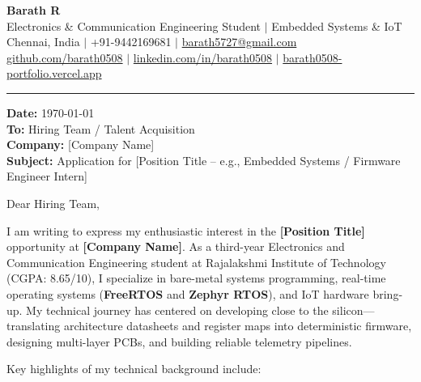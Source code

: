 \documentclass[a4paper,10pt]{article}
\begin{document}
\begin{center}
    {\LARGE \textbf{Barath R}} \\[3pt]
    Electronics \& Communication Engineering Student $\vert$ Embedded Systems \& IoT \\[2pt]
    Chennai, India $\vert$ +91-9442169681 $\vert$ \href{mailto:barath5727@gmail.com}{barath5727@gmail.com} \\
    \href{https://github.com/barath0508}{github.com/barath0508} $\vert$ \href{https://www.linkedin.com/in/barath0508/}{linkedin.com/in/barath0508} $\vert$ \href{https://barath0508-portfolio.vercel.app}{barath0508-portfolio.vercel.app}
\end{center}

\vspace{6pt}
\hrule
\vspace{12pt}

\textbf{Date:} \today \\
\textbf{To:} Hiring Team / Talent Acquisition \\
\textbf{Company:} [Company Name] \\
\textbf{Subject:} Application for [Position Title -- e.g., Embedded Systems / Firmware Engineer Intern]

\vspace{8pt}

Dear Hiring Team,

I am writing to express my enthusiastic interest in the \textbf{[Position Title]} opportunity at \textbf{[Company Name]}. As a third-year Electronics and Communication Engineering student at Rajalakshmi Institute of Technology (CGPA: 8.65/10), I specialize in bare-metal systems programming, real-time operating systems (\textbf{FreeRTOS} and \textbf{Zephyr RTOS}), and IoT hardware bring-up. My technical journey has centered on developing close to the silicon---translating architecture datasheets and register maps into deterministic firmware, designing multi-layer PCBs, and building reliable telemetry pipelines.

Key highlights of my technical background include:
\end{document}
